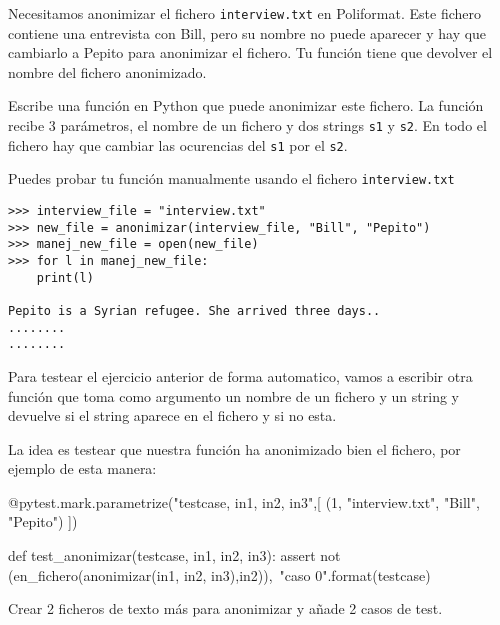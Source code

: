 \begin{ejercicio}
Necesitamos anonimizar el fichero \texttt{interview.txt} en Poliformat. Este fichero contiene una entrevista con Bill, pero su nombre no puede aparecer y hay que cambiarlo a Pepito para anonimizar el fichero. Tu función tiene que devolver el nombre del fichero anonimizado.


Escribe una función  en Python que puede anonimizar este fichero. La función recibe 3 parámetros, el nombre de un fichero y dos strings \texttt{s1} y \texttt{s2}. En todo el fichero hay que cambiar las ocurencias del \texttt{s1} por el \texttt{s2}.

Puedes probar tu función manualmente usando el fichero 
\texttt{interview.txt}\\

\begin{Verbatim}[frame=single]
>>> interview_file = "interview.txt"
>>> new_file = anonimizar(interview_file, "Bill", "Pepito")
>>> manej_new_file = open(new_file)
>>> for l in manej_new_file:
    print(l)
    
Pepito is a Syrian refugee. She arrived three days..
........
........
\end{Verbatim}
\end{ejercicio}


\begin{ejercicio}
Para testear el ejercicio anterior de forma automatico, vamos a escribir otra función
 que toma como argumento un nombre de un fichero y un string y devuelve  si el string aparece en el fichero y  si no esta.

La idea es testear que nuestra función  ha anonimizado bien el fichero, por ejemplo de esta manera:

\begin{python}
@pytest.mark.parametrize("testcase, in1, in2, in3",[
(1, "interview.txt", "Bill", "Pepito")
])              

def test_anonimizar(testcase, in1, in2, in3):
    assert not (en_fichero(anonimizar(in1, in2, in3),in2)),\
           "caso {0}".format(testcase)
\end{python}

Crear 2 ficheros de texto más para anonimizar y añade 2 casos de test.

\end{ejercicio}



